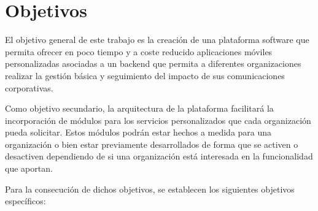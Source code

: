 \chapter{Objetivos}
El objetivo general de este trabajo es la creación de una plataforma software que permita ofrecer en poco tiempo y a coste reducido aplicaciones móviles personalizadas asociadas a un backend que permita a diferentes organizaciones realizar la gestión básica y seguimiento del impacto de sus comunicaciones corporativas.

Como objetivo secundario, la arquitectura de la plataforma facilitará la incorporación de módulos para los servicios personalizados que cada organización pueda solicitar. Estos módulos podrán estar hechos a medida para una organización o bien estar previamente desarrollados de forma que se activen o desactiven dependiendo de si una organización está interesada en la funcionalidad que aportan.

Para la consecución de dichos objetivos, se establecen los siguientes objetivos específicos:

